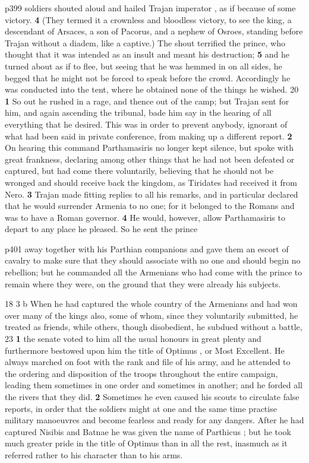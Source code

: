 p399 soldiers shouted aloud and hailed Trajan imperator , as if because of some victory. \textbf{4} (They termed it a crownless and bloodless victory, to see the king, a descendant of Arsaces, a son of Pacorus, and a nephew of Osroes, standing before Trajan without a diadem, like a captive.) The shout terrified the prince, who thought that it was intended as an insult and meant his destruction; \textbf{5} and he turned about as if to flee, but seeing that he was hemmed in on all sides, he begged that he might not be forced to speak before the crowd. Accordingly he was conducted into the tent, where he obtained none of the things he wished.
20
\textbf{1} So out he rushed in a rage, and thence out of the camp; but Trajan sent for him, and again ascending the tribunal, bade him say in the hearing of all everything that he desired. This was in order to prevent anybody, ignorant of what had been said in private conference, from making up a different report. \textbf{2} On hearing this command Parthamasiris no longer kept silence, but spoke with great frankness, declaring among other things that he had not been defeated or captured, but had come there voluntarily, believing that he should not be wronged and should receive back the kingdom, as Tiridates had received it from Nero. \textbf{3} Trajan made fitting replies to all his remarks, and in particular declared that he would surrender Armenia to no one; for it belonged to the Romans and was to have a Roman governor. \textbf{4} He would, however, allow Parthamasiris to depart to any place he pleased. So he sent the prince

p401 away together with his Parthian companions and gave them an escort of cavalry to make sure that they should associate with no one and should begin no rebellion; but he commanded all the Armenians who had come with the prince to remain where they were, on the ground that they were already his subjects.

18
3 b When he had captured the whole country of the Armenians and had won over many of the kings also, some of whom, since they voluntarily submitted, he treated as friends, while others, though disobedient, he subdued without a battle,
23
\textbf{1} the senate voted to him all the usual honours in great plenty and furthermore bestowed upon him the title of Optimus , or Most Excellent. He always marched on foot with the rank and file of his army, and he attended to the ordering and disposition of the troops throughout the entire campaign, leading them sometimes in one order and sometimes in another; and he forded all the rivers that they did. \textbf{2} Sometimes he even caused his scouts to circulate false reports, in order that the soldiers might at one and the same time practise military manoeuvres and become fearless and ready for any dangers. After he had captured Nisibis and Batnae he was given the name of Parthicus ; but he took much greater pride in the title of Optimus than in all the rest, inasmuch as it referred rather to his character than to his arms.

